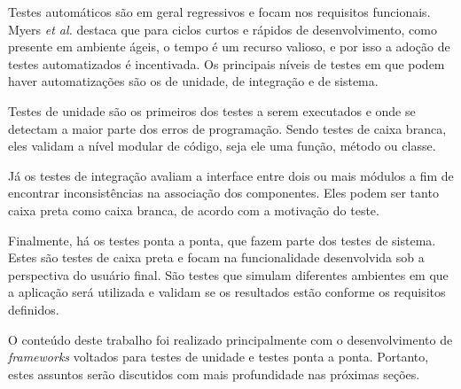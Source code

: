 Testes automáticos são em geral regressivos e focam nos requisitos funcionais. Myers \emph{et al.} \cite{myers} destaca que para ciclos curtos e rápidos de desenvolvimento, como presente em ambiente ágeis, o tempo é um recurso valioso, e por isso a adoção de testes automatizados é incentivada. Os principais níveis de testes em que podem haver automatizações são os de unidade, de integração e de sistema.

Testes de unidade são os primeiros dos testes a serem executados e onde se detectam a maior parte dos erros de programação. Sendo testes de caixa branca, eles validam a nível modular de código, seja ele uma função, método ou classe.

Já os testes de integração avaliam a interface entre dois ou mais módulos a fim de encontrar inconsistências na associação dos componentes. Eles podem ser tanto caixa preta como caixa branca, de acordo com a motivação do teste.

Finalmente, há os testes ponta a ponta, que fazem parte dos testes de sistema. Estes são testes de caixa preta e focam na funcionalidade desenvolvida sob a perspectiva do usuário final. São testes que simulam diferentes ambientes em que a aplicação será utilizada e validam se os resultados estão conforme os requisitos definidos.

O conteúdo deste trabalho foi realizado principalmente com o desenvolvimento de \emph{frameworks} voltados para testes de unidade e testes ponta a ponta. Portanto, estes assuntos serão discutidos com mais profundidade nas próximas seções.
